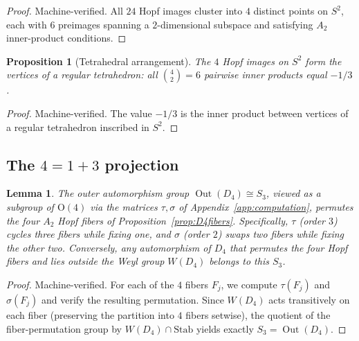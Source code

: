 \documentclass[11pt,reqno]{amsart}
\theoremstyle{plain}
\newtheorem{proposition}[theorem]{Proposition}
\newtheorem{lemma}[theorem]{Lemma}
\theoremstyle{definition}
\theoremstyle{remark}
\newcommand{\Stab}{\mathrm{Stab}}
\DeclareMathOperator{\Out}{Out}
\begin{document}
\begin{proof}
Machine-verified.
All $24$ Hopf images cluster into $4$ distinct points on $S^2$,
each with $6$ preimages spanning a $2$-dimensional subspace
and satisfying $A_2$ inner-product conditions.
\end{proof}

\begin{proposition}[Tetrahedral arrangement]
\label{prop:tetrahedron}
The $4$ Hopf images on $S^2$ form the vertices of a regular
tetrahedron: all $\binom{4}{2} = 6$ pairwise inner products
equal $-1/3$.
\end{proposition}

\begin{proof}
Machine-verified.
The value $-1/3$ is the inner product between vertices of a
regular tetrahedron inscribed in $S^2$.
\end{proof}

\subsection{The $4 = 1 + 3$ projection}

\begin{lemma}\label{lem:S3fibers}
The outer automorphism group $\Out(D_4) \cong S_3$, viewed as a
subgroup of $\mathrm{O}(4)$ via the matrices $\tau, \sigma$ of
Appendix~\ref{app:computation}, permutes the four $A_2$ Hopf
fibers of Proposition~\ref{prop:D4fibers}.
Specifically, $\tau$ (order $3$) cycles three fibers while
fixing one, and $\sigma$ (order $2$) swaps two fibers while
fixing the other two.
Conversely, any automorphism of $D_4$ that permutes the four
Hopf fibers and lies outside the Weyl group $W(D_4)$ belongs
to this $S_3$.
\end{lemma}

\begin{proof}
Machine-verified.
For each of the $4$ fibers $F_j$, we compute
$\tau(F_j)$ and $\sigma(F_j)$ and verify the resulting
permutation.
Since $W(D_4)$ acts transitively on each fiber (preserving
the partition into $4$ fibers setwise), the quotient of
the fiber-permutation group by $W(D_4) \cap \Stab$ yields
exactly $S_3 = \Out(D_4)$.
\end{proof}
\end{document}
